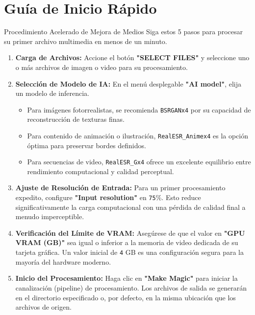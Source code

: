 \documentclass[11pt, a4paper]{article}
\newcommand{\SectionColor}{WarlockGray} %
\newcommand{\setsectioncolor}[1]{\renewcommand{\SectionColor}{#1}}
\newcommand{\inlinecode}[1]{\colorbox{WarlockLightGray}{\small\texttt{#1}}}
\begin{document}
\section{Guía de Inicio Rápido}
\begin{quickstartbox}{Procedimiento Acelerado de Mejora de Medios}
Siga estos 5 pasos para procesar su primer archivo multimedia en menos de un minuto.
\begin{enumerate}
    \item \textbf{Carga de Archivos:} Accione el botón \textbf{"SELECT FILES"} y seleccione uno o más archivos de imagen o video para su procesamiento.
    \item \textbf{Selección de Modelo de IA:} En el menú desplegable \textbf{"AI model"}, elija un modelo de inferencia.
    \begin{itemize}
        \item Para imágenes fotorrealistas, se recomienda \inlinecode{BSRGANx4} por su capacidad de reconstrucción de texturas finas.
        \item Para contenido de animación o ilustración, \inlinecode{RealESR_Animex4} es la opción óptima para preservar bordes definidos.
        \item Para secuencias de video, \inlinecode{RealESR_Gx4} ofrece un excelente equilibrio entre rendimiento computacional y calidad perceptual.
    \end{itemize}
    \item \textbf{Ajuste de Resolución de Entrada:} Para un primer procesamiento expedito, configure \textbf{"Input resolution"} en \texttt{75}\%. Esto reduce significativamente la carga computacional con una pérdida de calidad final a menudo imperceptible.
    \item \textbf{Verificación del Límite de VRAM:} Asegúrese de que el valor en \textbf{"GPU VRAM (GB)"} sea igual o inferior a la memoria de video dedicada de su tarjeta gráfica. Un valor inicial de \texttt{4} GB es una configuración segura para la mayoría del hardware moderno.
    \item \textbf{Inicio del Procesamiento:} Haga clic en \textbf{"Make Magic"} para iniciar la canalización (pipeline) de procesamiento. Los archivos de salida se generarán en el directorio especificado o, por defecto, en la misma ubicación que los archivos de origen.
\end{enumerate}
\end{quickstartbox}

\setsectioncolor{InstallColor}
\end{document}
